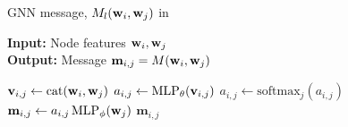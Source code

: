 \begin{algorithm}[tb]
   \caption{GNN message, $M_l({\mathbf{w}}_i, {\mathbf{w}}_j)$ in }
   \label{algo:gnn_message}
   \hspace*{\algorithmicindent} \textbf{Input:} Node features ${\mathbf{w}}_i, {\mathbf{w}}_j$ \\
   \hspace*{\algorithmicindent} \textbf{Output:} Message $\mathbf{m}_{i,j} = M({\mathbf{w}}_i, {\mathbf{w}}_j)$
\begin{algorithmic}
\STATE ${\mathbf{v}}_{i,j}\gets \text{cat}({\mathbf{w}}_i, {\mathbf{w}}_j)$
\STATE $a_{i,j} \gets \operatorname{MLP}_{\theta}({\mathbf{v}}_{i,j})$ 
\STATE $a_{i,j} \gets \text{softmax}_{j}(a_{i,j})$ 
\STATE ${\mathbf{m}}_{i,j} \gets a_{i,j} \operatorname{MLP}_\phi({\mathbf{w}}_j)$
\RETURN $\mathbf{m}_{i,j}$
\end{algorithmic}
\end{algorithm}
